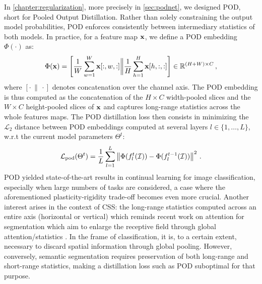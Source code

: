 In \autoref{chapter:regularization}, more precisely in \autoref{sec:podnet}, we designed POD, short
for Pooled Output Distillation. Rather than solely constraining the output model probabilities, POD
enforces consistently between intermediary statistics of both models. In practice, for a feature map
$\mathbf{x}$, we define a POD embedding $\Phi(\cdot)$ as:
%
\begin{equation}
    \Phi(\mathbf{x}) = \left[\frac{1}{W} \sum_{w=1}^W \mathbf{x}[:,w,:] \bigg\Vert \frac{1}{H} \sum_{h=1}^H \mathbf{x}[h,:,:]\right] \in \mathbb{R}^{(H + W) \times C}\,,
    \label{eq:seg_pod_embedding}
\end{equation}
%
where $[\cdot\,\|\,\cdot]$ denotes concatenation over the channel axis. The POD embedding is thus
computed as the concatenation of the $H \times C$ width-pooled slices and the $W \times C$
height-pooled slices of $\mathbf{x}$ and captures long-range statistics across the whole features maps. The
POD distillation loss then consists in minimizing the $\mathcal{L}_2$ distance between POD
embeddings computed at several layers $l \in \{1, \dots, L\}$, w.r.t the current model parameters
$\Theta^t$:
%
\begin{equation}
    \mathcal{L}_\text{pod}(\Theta^t) = \frac{1}{L} \sum_{l = 1}^L \left\Vert  \Phi(f^t_l(\mathcal{I})) -  \Phi(f^{t-1}_l(\mathcal{I})) \right\Vert^2\,.
    \label{eq:seg_pod_loss}
\end{equation}
%
POD yielded state-of-the-art results in continual learning for image classification, especially when
large numbers of tasks are considered, a case where the aforementioned plasticity-rigidity trade-off
becomes even more crucial. Another interest arises in the context of \ac{CSS}: the long-range statistics
computed across an entire axis (horizontal or vertical) which reminds recent work on attention for
segmentation \citep{wang2020axialdeeplab,huang2020ccnet,park2020csc} which aim to enlarge the
receptive field through global attention/statistics \citep{wang2020axialdeeplab}. In the frame of
classification, it is, to a certain extent, necessary to discard spatial information through global
pooling. However, conversely, semantic segmentation requires preservation of both long-range and
short-range statistics, making a distillation loss such as POD suboptimal for that purpose.


